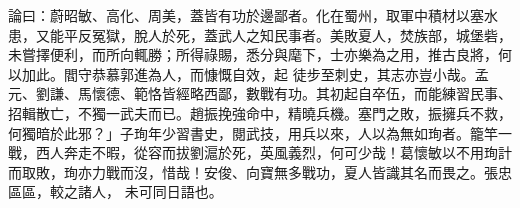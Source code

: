 \begin{pinyinscope}
 論曰：蔚昭敏、高化、周美，蓋皆有功於邊鄙者。化在蜀州，取軍中積材以塞水患，又能平反冤獄，脫人於死，蓋武人之知民事者。美敗夏人，焚族部，城堡砦，未嘗擇便利，而所向輒勝；所得祿賜，悉分與麾下，士亦樂為之用，推古良將，何以加此。閻守恭慕郭進為人，而慷慨自效，起
 徒步至刺史，其志亦豈小哉。孟元、劉謙、馬懷德、範恪皆經略西鄙，數戰有功。其初起自卒伍，而能練習民事、招輯散亡，不獨一武夫而已。趙振挽強命中，精曉兵機。塞門之敗，振擁兵不救，何獨暗於此邪？」子珣年少習書史，閱武技，用兵以來，人以為無如珣者。籠竿一戰，西人奔走不暇，從容而拔劉滬於死，英風義烈，何可少哉！葛懷敏以不用珣計而取敗，珣亦力戰而沒，惜哉！安俊、向寶無多戰功，夏人皆識其名而畏之。張忠區區，較之諸人，
 未可同日語也。



\end{pinyinscope}